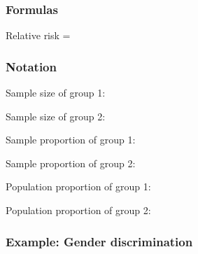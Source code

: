\documentclass[
]{report}
\newcommand{\rgs}{\vspace{12pt}} %
\begin{document}
\hypertarget{formulas-3}{%
\subsubsection*{Formulas}\label{formulas-3}}

Relative risk =
\rgs

\hypertarget{notation}{%
\subsubsection*{Notation}\label{notation}}

Sample size of group 1:
\rgs

Sample size of group 2:
\rgs

Sample proportion of group 1:
\rgs

Sample proportion of group 2:
\rgs

Population proportion of group 1:
\rgs

Population proportion of group 2:
\rgs

\hypertarget{example-gender-discrimination}{%
\subsubsection*{Example: Gender discrimination}\label{example-gender-discrimination}}
\end{document}
